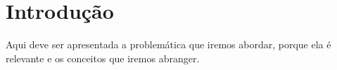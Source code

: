 \section{Introdução}

Aqui deve ser apresentada a problemática que iremos abordar, porque ela é relevante e os conceitos que iremos abranger.
